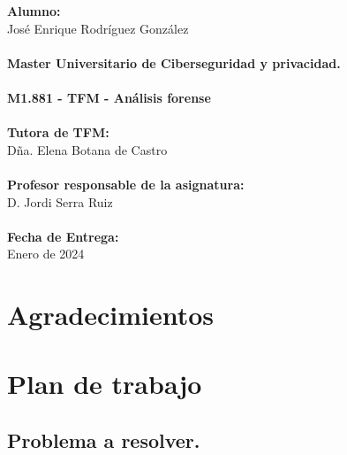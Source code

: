 \documentclass[12pt,a4paper]{report}
\begin{document}
\begin{titlepage}
\begin{minipage}{0.5\textwidth}
    \end{minipage}
    \begin{minipage}{0.5\textwidth}
        \textbf{Alumno:} \\
        {José Enrique Rodríguez González} \\
        \\
        \textbf{Master Universitario de Ciberseguridad y privacidad.} \\
        \\
        \textbf{M1.881 - TFM - Análisis forense} \\
        \\
        \textbf{Tutora de TFM:} \\
        {Dña. Elena Botana de Castro} \\
        \\
        \textbf{Profesor responsable de la asignatura:} \\
        {D. Jordi Serra Ruiz} \\
        \\
        \textbf{Fecha de Entrega:} \\
        {Enero de 2024}
    \end{minipage}
    
    \vfill %
    
    
\end{titlepage}
\restoregeometry 


\newpage  %
\chapter*{Agradecimientos}  %


\tableofcontents %

\newpage
{} 

\chapter{Plan de trabajo}

\section{Problema a resolver.}
 
\end{document}

